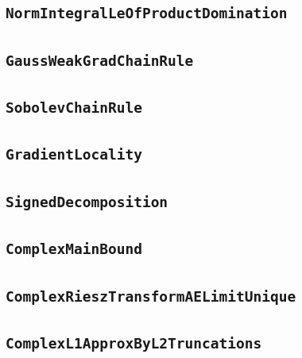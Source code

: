\documentclass[11pt]{amsart}
\theoremstyle{definition}
\begin{document}
\subsection{\texorpdfstring{\texttt{NormIntegralLeOfProductDomination}}{NormIntegralLeOfProductDomination}}\label{node:NormIntegralLeOfProductDomination}


\subsection{\texorpdfstring{\texttt{GaussWeakGradChainRule}}{GaussWeakGradChainRule}}\label{node:GaussWeakGradChainRule}


\subsection{\texorpdfstring{\texttt{SobolevChainRule}}{SobolevChainRule}}\label{node:SobolevChainRule}


\subsection{\texorpdfstring{\texttt{GradientLocality}}{GradientLocality}}\label{node:GradientLocality}


\subsection{\texorpdfstring{\texttt{SignedDecomposition}}{SignedDecomposition}}\label{node:SignedDecomposition}


\subsection{\texorpdfstring{\texttt{ComplexMainBound}}{ComplexMainBound}}\label{node:ComplexMainBound}


\subsection{\texorpdfstring{\texttt{ComplexRieszTransformAELimitUnique}}{ComplexRieszTransformAELimitUnique}}\label{node:ComplexRieszTransformAELimitUnique}


\subsection{\texorpdfstring{\texttt{ComplexL1ApproxByL2Truncations}}{ComplexL1ApproxByL2Truncations}}\label{node:ComplexL1ApproxByL2Truncations}

\end{document}

